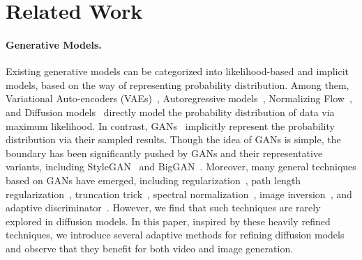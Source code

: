 \documentclass[letterpaper]{article}
\begin{document}
\section{Related Work}
\paragraph{Generative Models.}
Existing generative models can be categorized into likelihood-based and implicit models, based on the way of representing probability distribution.
Among them, Variational Auto-encoders (VAEs)~\cite{kingma2013auto}, Autoregressive models~\cite{van2016pixel, germain2015made}, Normalizing Flow~\cite{dinh2016density}, and Diffusion models~\cite{sohl2015deep, ho2020denoising} directly model the probability distribution of data via maximum likelihood.
In contrast, GANs~\cite{goodfellow2014generative} implicitly represent the probability distribution via their sampled results.
Though the idea of GANs is simple, the boundary has been significantly pushed by GANs and their representative variants, including StyleGAN~\cite{karras2019style, karras2020analyzing, karras2020training} and BigGAN~\cite{brock2018large}.
Moreover, many general techniques based on GANs have emerged, including  regularization~\cite{mescheder2018training}, path length regularization~\cite{karras2020analyzing}, truncation trick~\cite{karras2019style}, spectral normalization~\cite{miyato2018spectral}, image inversion~\cite{mei2021ltt}, and adaptive discriminator~\cite{karras2020training}.
However, we find that such techniques are rarely explored in diffusion models.
In this paper, inspired by these heavily refined techniques, we introduce several adaptive methods for refining diffusion models and observe that they benefit for both video and image generation.
\end{document}
